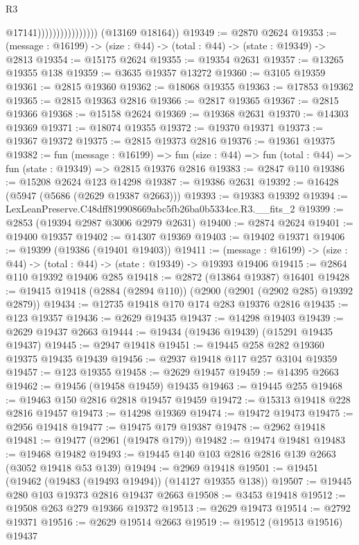 \begin{lexlean}{R3}
\begin{coremodule}
                                      @17141))))))))))))))))
      (@13169 @18164))
@19349 := @2870 @2624
@19353 := (message : @16199) -> (size : @44) -> (total : @44) -> (state : @19349) -> @2813
@19354 := @15175 @2624
@19355 := @19354 @2631
@19357 := @13265 @19355 @138
@19359 := @3635 @19357 @13272
@19360 := @3105 @19359
@19361 := @2815 @19360
@19362 := @18068 @19355
@19363 := @17853 @19362
@19365 := @2815 @19363 @2816
@19366 := @2817 @19365
@19367 := @2815 @19366
@19368 := @15158 @2624
@19369 := @19368 @2631
@19370 := @14303 @19369
@19371 := @18074 @19355
@19372 := @19370 @19371
@19373 := @19367 @19372
@19375 := @2815 @19373 @2816
@19376 := @19361 @19375
@19382 := fun (message : @16199) =>
  fun (size : @44) => fun (total : @44) => fun (state : @19349) => @2815 @19376 @2816
@19383 := @2847 @110
@19386 := @15208 @2624 @123 @14298
@19387 := @19386 @2631
@19392 := @16428 (@5947 (@5686 (@2629 @19387 @2663)))
@19393 := @19383 @19392
@19394 := LexLeanPreserve.C48dff819908669abc5fb26ba0b5334ce.R3.__fits_2
@19399 := @2853 (@19394 @2987 @3006 @2979 @2631)
@19400 := @2874 @2624
@19401 := @19400 @19357
@19402 := @14307 @19369
@19403 := @19402 @19371
@19406 := @19399 (@19386 (@19401 @19403))
@19411 := (message : @16199) -> (size : @44) -> (total : @44) -> (state : @19349) -> @19393 @19406
@19415 := @2864 @110 @19392 @19406 @285
@19418 := @2872 (@13864 @19387) @16401
@19428 := @19415 @19418 (@2884 (@2894 @110)) (@2900 (@2901 (@2902 @285) @19392 @2879))
@19434 := @12735 @19418 @170 @174 @283 @19376 @2816
@19435 := @123 @19357
@19436 := @2629 @19435
@19437 := @14298 @19403
@19439 := @2629 @19437 @2663
@19444 := @19434 (@19436 @19439) (@15291 @19435 @19437)
@19445 := @2947 @19418
@19451 := @19445 @258 @282 @19360 @19375 @19435 @19439
@19456 := @2937 @19418 @117 @257 @3104 @19359
@19457 := @123 @19355
@19458 := @2629 @19457
@19459 := @14395 @2663
@19462 := @19456 (@19458 @19459) @19435
@19463 := @19445 @255
@19468 := @19463 @150 @2816 @2818 @19457 @19459
@19472 := @15313 @19418 @228 @2816 @19457
@19473 := @14298 @19369
@19474 := @19472 @19473
@19475 := @2956 @19418
@19477 := @19475 @179 @19387
@19478 := @2962 @19418
@19481 := @19477 (@2961 (@19478 @179))
@19482 := @19474 @19481
@19483 := @19468 @19482
@19493 := @19445 @140 @103 @2816 @2816 @139 @2663 (@3052 @19418 @53 @139)
@19494 := @2969 @19418
@19501 := @19451 (@19462 (@19483 (@19493 @19494)) (@14127 @19355 @138))
@19507 := @19445 @280 @103 @19373 @2816 @19437 @2663
@19508 := @3453 @19418
@19512 := @19508 @263 @279 @19366 @19372
@19513 := @2629 @19473
@19514 := @2792 @19371
@19516 := @2629 @19514 @2663
@19519 := @19512 (@19513 @19516) @19437

\end{coremodule}
\end{lexlean}
